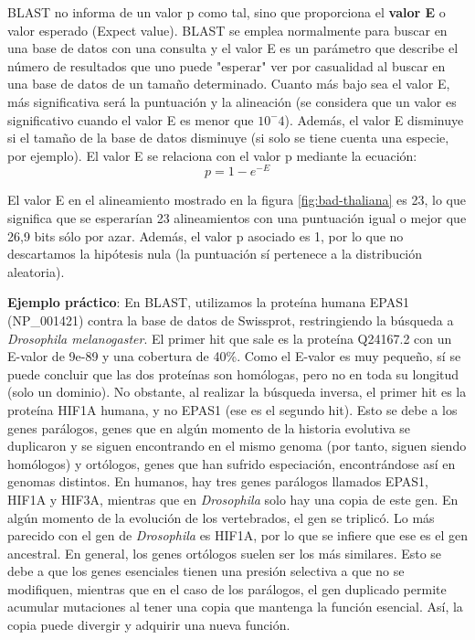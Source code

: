 BLAST no informa de un valor p como tal, sino que proporciona el \textbf{valor E} o valor esperado (Expect value). BLAST se emplea normalmente para buscar en una base de datos con una consulta y el valor E es un parámetro que describe el número de resultados que uno puede "esperar" ver por casualidad al buscar en una base de datos de un tamaño determinado. Cuanto más bajo sea el valor E, más significativa será la puntuación y la alineación (se considera que un valor es significativo cuando el valor E es menor que $10^-4$). Además, el valor E disminuye si el tamaño de la base de datos disminuye (si solo se tiene cuenta una especie, por ejemplo). El valor E se relaciona con el valor p mediante la ecuación:
$$p = 1 - e^{-E}$$

El valor E en el alineamiento mostrado en la figura \ref{fig:bad-thaliana} es 23, lo que significa que se esperarían 23 alineamientos con una puntuación igual o mejor que 26,9 bits sólo por azar. Además, el valor p asociado es 1, por lo que no descartamos la hipótesis nula (la puntuación sí pertenece a la distribución aleatoria).

\textbf{Ejemplo práctico}: 
En BLAST, utilizamos la proteína humana EPAS1 (NP\_001421) contra la base de datos de Swissprot, restringiendo la búsqueda a \textit{Drosophila melanogaster}. El primer hit que sale es la proteína 	Q24167.2 con un E-valor de 9e-89 y una cobertura de 40\%. Como el E-valor es muy pequeño, sí se puede concluir que las dos proteínas son homólogas, pero no en toda su longitud (solo un dominio). No obstante, al realizar la búsqueda inversa, el primer hit es la proteína HIF1A humana, y no EPAS1 (ese es el segundo hit). Esto se debe a los genes parálogos, genes que en algún momento de la historia evolutiva se duplicaron y se siguen encontrando en el mismo genoma (por tanto, siguen siendo homólogos) y ortólogos, genes que han sufrido especiación, encontrándose así en genomas distintos. En humanos, hay tres genes parálogos llamados EPAS1, HIF1A y HIF3A, mientras que en \textit{Drosophila} solo hay una copia de este gen. En algún momento de la evolución de los vertebrados, el gen se triplicó. Lo más parecido con el gen de \textit{Drosophila} es HIF1A, por lo que se infiere que ese es el gen ancestral. En general, los genes ortólogos suelen ser los más similares. Esto se debe a que los genes esenciales tienen una presión selectiva a que no se modifiquen, mientras que en el caso de los parálogos, el gen duplicado permite acumular mutaciones al tener una copia que mantenga la función esencial. Así, la copia puede divergir y adquirir una nueva función. 


